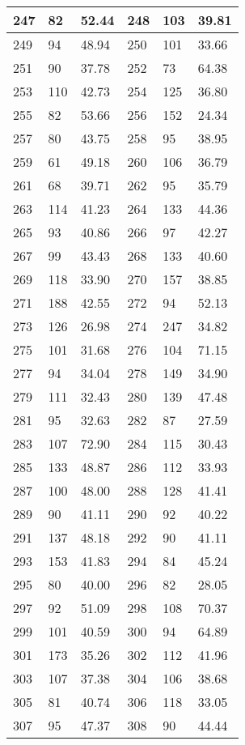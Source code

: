 {\begin{longtable}{|p{3cm}|p{3cm}|p{3cm}|p{3cm}|p{3cm}|p{3cm}|}
\hline
247 & 82& 52.44 & 248 & 103& 39.81\\
\hline
249 & 94& 48.94 & 250 & 101& 33.66\\
\hline
251 & 90& 37.78 & 252 & 73& 64.38\\
\hline
253 & 110& 42.73 & 254 & 125& 36.80\\
\hline
255 & 82& 53.66 & 256 & 152& 24.34\\
\hline
257 & 80& 43.75 & 258 & 95& 38.95\\
\hline
259 & 61& 49.18 & 260 & 106& 36.79\\
\hline
261 & 68& 39.71 & 262 & 95& 35.79\\
\hline
263 & 114& 41.23 & 264 & 133& 44.36\\
\hline
265 & 93& 40.86 & 266 & 97& 42.27\\
\hline
267 & 99& 43.43 & 268 & 133& 40.60\\
\hline
269 & 118& 33.90 & 270 & 157& 38.85\\
\hline
271 & 188& 42.55 & 272 & 94& 52.13\\
\hline
273 & 126& 26.98 & 274 & 247& 34.82\\
\hline
275 & 101& 31.68 & 276 & 104& 71.15\\
\hline
277 & 94& 34.04 & 278 & 149& 34.90\\
\hline
279 & 111& 32.43 & 280 & 139& 47.48\\
\hline
281 & 95& 32.63 & 282 & 87& 27.59\\
\hline
283 & 107& 72.90 & 284 & 115& 30.43\\
\hline
285 & 133& 48.87 & 286 & 112& 33.93\\
\hline
287 & 100& 48.00 & 288 & 128& 41.41\\
\hline
289 & 90& 41.11 & 290 & 92& 40.22\\
\hline
291 & 137& 48.18 & 292 & 90& 41.11\\
\hline
293 & 153& 41.83 & 294 & 84& 45.24\\
\hline
295 & 80& 40.00 & 296 & 82& 28.05\\
\hline
297 & 92& 51.09 & 298 & 108& 70.37\\
\hline
299 & 101& 40.59 & 300 & 94& 64.89\\
\hline
301 & 173& 35.26 & 302 & 112& 41.96\\
\hline
303 & 107& 37.38 & 304 & 106& 38.68\\
\hline
305 & 81& 40.74 & 306 & 118& 33.05\\
\hline
307 & 95& 47.37 & 308 & 90& 44.44\\

\end{longtable}}
